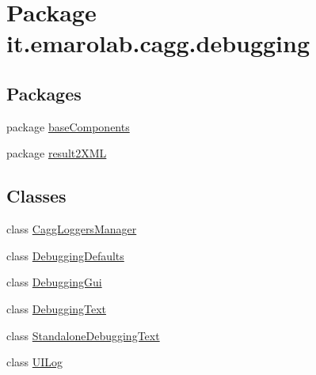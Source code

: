 \hypertarget{namespaceit_1_1emarolab_1_1cagg_1_1debugging}{\section{Package it.\-emarolab.\-cagg.\-debugging}
\label{namespaceit_1_1emarolab_1_1cagg_1_1debugging}
}
\subsection*{Packages}
\begin{DoxyCompactItemize}
\item 
package \hyperlink{namespaceit_1_1emarolab_1_1cagg_1_1debugging_1_1baseComponents}{base\-Components}
\item 
package \hyperlink{namespaceit_1_1emarolab_1_1cagg_1_1debugging_1_1result2XML}{result2\-X\-M\-L}
\end{DoxyCompactItemize}
\subsection*{Classes}
\begin{DoxyCompactItemize}
\item 
class \hyperlink{classit_1_1emarolab_1_1cagg_1_1debugging_1_1CaggLoggersManager}{Cagg\-Loggers\-Manager}
\item 
class \hyperlink{classit_1_1emarolab_1_1cagg_1_1debugging_1_1DebuggingDefaults}{Debugging\-Defaults}
\item 
class \hyperlink{classit_1_1emarolab_1_1cagg_1_1debugging_1_1DebuggingGui}{Debugging\-Gui}
\item 
class \hyperlink{classit_1_1emarolab_1_1cagg_1_1debugging_1_1DebuggingText}{Debugging\-Text}
\item 
class \hyperlink{classit_1_1emarolab_1_1cagg_1_1debugging_1_1StandaloneDebuggingText}{Standalone\-Debugging\-Text}
\item 
class \hyperlink{classit_1_1emarolab_1_1cagg_1_1debugging_1_1UILog}{U\-I\-Log}
\end{DoxyCompactItemize}

